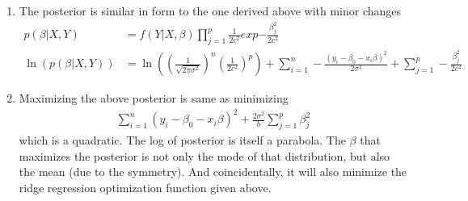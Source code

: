 \documentclass[../statistical_learning_notes.tex]{subfiles}
\begin{document}
\begin{enumerate}
\begin{enumerate}
            \item The posterior is similar in form to the one derived above with minor changes
            \begin{align*}
                p(\beta|X,Y) &= f(Y|X,\beta)\prod_{j=1}^{p}\frac{1}{2c^{2}}exp{-\frac{\beta_{j}^{2}}{2c^{2}}}\\
                \ln(p(\beta|X,Y)) &= \ln((\frac{1}{\sqrt{2\pi \sigma^{2}}})^{n} (\frac{1}{2c^{2}})^{p}) + \sum_{i=1}^{n} -\frac{(y_{i}-\beta_{0}-x_{i}\beta)^{2}}{2\sigma^{2}} + \sum_{j=1}^{p} -\frac{\beta_{j}^{2}}{2c^{2}}
            \end{align*}
            \item Maximizing the above posterior is same as minimizing
            \begin{align*}
                \sum_{i=1}^{n} (y_{i}-\beta_{0}-x_{i}\beta)^{2} + \frac{2\sigma^{2}}{b}\sum_{j=1}^{p} \beta_{j}^{2}
            \end{align*}
            which is a quadratic. The log of posterior is itself a parabola. The $\beta$ that maximizes the posterior is not only the mode of that distribution, but also the mean (due to the symmetry). And coincidentally, it will also minimize the ridge regression optimization function given above.
        \end{enumerate}
    \end{enumerate}
\end{document}
